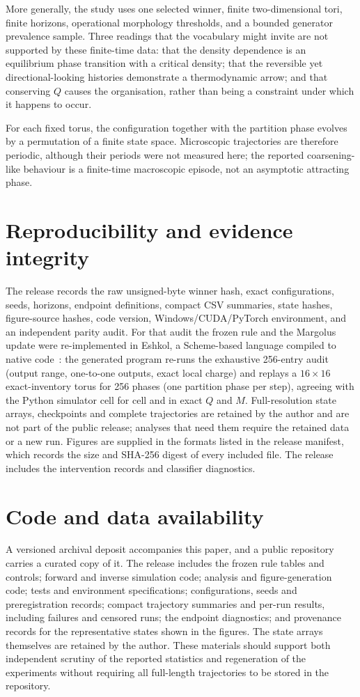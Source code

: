 \documentclass[11pt,a4paper]{article}
\begin{document}
More generally, the study uses one selected winner, finite two-dimensional tori, finite horizons, operational morphology thresholds, and a bounded generator prevalence sample. Three readings that the vocabulary might invite are not supported by these finite-time data: that the density dependence is an equilibrium phase transition with a critical density; that the reversible yet directional-looking histories demonstrate a thermodynamic arrow; and that conserving $Q$ causes the organisation, rather than being a constraint under which it happens to occur.

For each fixed torus, the configuration together with the partition phase evolves by a permutation of a finite state space. Microscopic trajectories are therefore periodic, although their periods were not measured here; the reported coarsening-like behaviour is a finite-time macroscopic episode, not an asymptotic attracting phase.

\section{Reproducibility and evidence integrity}
The release records the raw unsigned-byte winner hash, exact configurations, seeds, horizons, endpoint definitions, compact CSV summaries, state hashes, figure-source hashes, code version, Windows/CUDA/PyTorch environment, and an independent parity audit. For that audit the frozen rule and the Margolus update were re-implemented in Eshkol, a Scheme-based language compiled to native code~\citep{Tsotchke2026Eshkol}: the generated program re-runs the exhaustive 256-entry audit (output range, one-to-one outputs, exact local charge) and replays a $16\times16$ exact-inventory torus for 256 phases (one partition phase per step), agreeing with the Python simulator cell for cell and in exact $Q$ and $M$. Full-resolution state arrays, checkpoints and complete trajectories are retained by the author and are not part of the public release; analyses that need them require the retained data or a new run. Figures are supplied in the formats listed in the release manifest, which records the size and SHA-256 digest of every included file. The release includes the intervention records and classifier diagnostics.

\section{Code and data availability}
A versioned archival deposit accompanies this paper, and a public repository carries a curated copy of it. The release includes the frozen rule tables and controls; forward and inverse simulation code; analysis and figure-generation code; tests and environment specifications; configurations, seeds and preregistration records; compact trajectory summaries and per-run results, including failures and censored runs; the endpoint diagnostics; and provenance records for the representative states shown in the figures. The state arrays themselves are retained by the author. These materials should support both independent scrutiny of the reported statistics and regeneration of the experiments without requiring all full-length trajectories to be stored in the repository.
\end{document}
